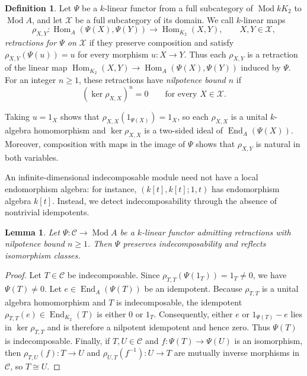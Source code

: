 \documentclass[a4paper,reqno,10pt]{amsart}
\newtheorem{lemma}[theorem]{Lemma}
\theoremstyle{definition}
\newtheorem{definition}[theorem]{Definition}
\DeclareMathOperator{\Hom}{Hom}
\DeclareMathOperator{\End}{End}
\DeclareMathOperator{\Mod}{Mod}
\newcommand{\C}{\mathcal C}
\numberwithin{equation}{section}
\begin{document}
\begin{definition}\label{def:retraction}
Let $\Psi$ be a $k$-linear functor from a full subcategory of $\Mod kK_2$
to $\Mod A$, and let $\mathcal X$ be a full subcategory
of its domain. We call $k$-linear maps
\[
 \rho_{X,Y}:\Hom_A(\Psi(X),\Psi(Y))\longrightarrow\Hom_{K_2}(X,Y),\qquad
 X,Y\in\mathcal X,
\]
\emph{retractions for $\Psi$ on $\mathcal X$} if they preserve composition
and satisfy $\rho_{X,Y}(\Psi(u))=u$ for every morphism $u:X\to Y$. Thus
each $\rho_{X,Y}$ is a retraction of the linear map
$\Hom_{K_2}(X,Y)\to\Hom_A(\Psi(X),\Psi(Y))$ induced by $\Psi$.
For an integer $n\ge1$, these retractions have \emph{nilpotence bound $n$} if
\begin{equation}\label{eq:nilpotence-bound}
 (\ker\rho_{X,X})^n=0\qquad\text{for every }X\in\mathcal X.
\end{equation}
\end{definition}
Taking $u=1_X$ shows that $\rho_{X,X}(1_{\Psi(X)})=1_X$, so each $\rho_{X,X}$ is a unital $k$-algebra homomorphism and $\ker\rho_{X,X}$ is a two-sided ideal of $\End_A(\Psi(X))$. Moreover, composition
with maps in the image of $\Psi$ shows that $\rho_{X,Y}$ is natural in both variables.

An infinite-dimensional indecomposable module need not have a local
endomorphism algebra: for instance, $(k[t],k[t];1,t)$ has endomorphism algebra $k[t]$.
Instead, we detect indecomposability through the absence of nontrivial idempotents.
\begin{lemma}\label{lem:retraction-consequences}
Let $\Psi:\C\to\Mod A$ be a $k$-linear functor admitting retractions
with nilpotence bound $n\ge1$. Then $\Psi$ preserves indecomposability
and reflects isomorphism classes.
\end{lemma}
\begin{proof}
Let $T\in\C$ be indecomposable. Since $\rho_{T,T}(\Psi(1_T))=1_T\ne0$, we have $\Psi(T)\ne0$. Let $e\in\End_A(\Psi(T))$ be an
idempotent. Because $\rho_{T,T}$ is a unital algebra homomorphism and $T$ is indecomposable, the idempotent
$\rho_{T,T}(e)\in\End_{K_2}(T)$ is either $0$ or $1_T$. Consequently, either $e$ or $1_{\Psi(T)}-e$ lies in $\ker\rho_{T,T}$ and is therefore a
nilpotent idempotent and hence zero. Thus $\Psi(T)$ is indecomposable.
Finally, if $T,U\in\C$ and $f:\Psi(T)\to\Psi(U)$ is an isomorphism, then
$\rho_{T,U}(f):T\to U$ and $\rho_{U,T}(f^{-1}):U\to T$ are mutually inverse morphisms in $\C$, so $T\cong U$.
\end{proof}
\end{document}
